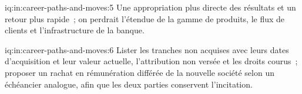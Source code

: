 \begin{solution}{iq:in:career-paths-and-moves:5}
Une appropriation plus directe des résultats et un retour plus rapide~; on perdrait l'étendue de la gamme de produits, le flux de clients et
l'infrastructure de la banque.
\end{solution}

\begin{solution}{iq:in:career-paths-and-moves:6}
Lister les tranches non acquises avec leurs dates d'acquisition et leur valeur actuelle, l'attribution non versée et les droits courus~; proposer un rachat
en rémunération différée de la nouvelle société selon un échéancier analogue, afin que les deux parties conservent l'incitation.
\end{solution}
